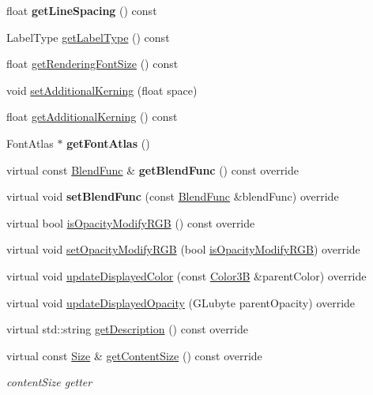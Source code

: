 \begin{DoxyCompactItemize}
float {\bfseries get\+Line\+Spacing} () const
\item 
Label\+Type \hyperlink{classLabel_a4bcb53b50d92e4cb056c2c5b4a59bbfd}{get\+Label\+Type} () const
\item 
float \hyperlink{classLabel_a832e00fc1f2944499ed96871cdc43fa8}{get\+Rendering\+Font\+Size} () const
\item 
void \hyperlink{classLabel_aef8a7f1ece5bb313fce798b1538640d7}{set\+Additional\+Kerning} (float space)
\item 
float \hyperlink{classLabel_a4dc8b796743eddc146f8f248b08a7db6}{get\+Additional\+Kerning} () const
\item 
\mbox{\label{classLabel_a0f3c9daca925dfa753e1e963e6923aa8}} 
Font\+Atlas $\ast$ {\bfseries get\+Font\+Atlas} ()
\item 
\mbox{\label{classLabel_adf030b51b2614a1bc3251763c61759da}} 
virtual const \hyperlink{structBlendFunc}{Blend\+Func} \& {\bfseries get\+Blend\+Func} () const override
\item 
\mbox{\label{classLabel_a8fcbdc3618995495413850a60cf184fc}} 
virtual void {\bfseries set\+Blend\+Func} (const \hyperlink{structBlendFunc}{Blend\+Func} \&blend\+Func) override
\item 
virtual bool \hyperlink{classLabel_ade8bf273e99add4d4861697d469f6d89}{is\+Opacity\+Modify\+R\+GB} () const override
\item 
virtual void \hyperlink{classLabel_a29fe05b89ed819988763ae013ca8fe48}{set\+Opacity\+Modify\+R\+GB} (bool \hyperlink{classLabel_ade8bf273e99add4d4861697d469f6d89}{is\+Opacity\+Modify\+R\+GB}) override
\item 
virtual void \hyperlink{classLabel_a5810437c76649477d86f278a15e5f260}{update\+Displayed\+Color} (const \hyperlink{structColor3B}{Color3B} \&parent\+Color) override
\item 
virtual void \hyperlink{classLabel_a89d48e49df588b91d259cac6f8732162}{update\+Displayed\+Opacity} (G\+Lubyte parent\+Opacity) override
\item 
virtual std\+::string \hyperlink{classLabel_ae79fa577b14144f17662dd8432ecd237}{get\+Description} () const override
\item 
virtual const \hyperlink{classSize}{Size} \& \hyperlink{classLabel_a6ff9d78705856ffaf4b5258682e1df00}{get\+Content\+Size} () const override
\begin{DoxyCompactList}\small\item\em content\+Size getter \end{DoxyCompactList}\item 

\end{DoxyCompactItemize}
